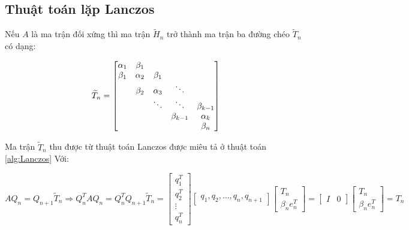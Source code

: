 \documentclass[14pt, a4paper]{article}
\numberwithin{equation}{section}
\numberwithin{algorithm}{section}
\numberwithin{figure}{section}
\numberwithin{dl}{section}
\numberwithin{md}{section}
\numberwithin{bd}{section}
\numberwithin{dn}{section}
\numberwithin{hq}{section}
\begin{document}
\subsection{Thuật toán lặp Lanczos} \label{Lanczos-Algorithm}


Nếu $A$ là ma trận đối xứng thì ma trận $\widetilde{H}_n$ trở thành ma trận ba đường chéo $\widetilde{T}_n$ có dạng:

\begin{equation} \label{eq:Trigonal_Matrix}
    \widetilde{T}_n = \begin{bmatrix}
        \alpha_1 & \beta_1 & \space & \space & \space \\
        \beta_1 & \alpha_2 & \beta_1 & \space & \space \\
        \space & \beta_2 & \alpha_3 & \ddots & \space \\
        \space & \space & \ddots & \ddots & \beta_{k-1} \\
        \space & \space & \space & \beta_{k-1} & \alpha_k \\
        \space & \space & \space & \space & \beta_{n}
    \end{bmatrix}
\end{equation}

Ma trận $\widetilde{T}_n$ thu được từ thuật toán Lanczos được miêu tả ở thuật toán \ref{alg:Lanczos}
Với:

\begin{equation} \label{eq:Three-term-recurrence}
    AQ_n = Q_{n+1}\widetilde{T}_n \Rightarrow Q_n^TAQ_n = Q_n^TQ_{n+1}\widetilde{T}_n=\begin{bmatrix}
        q_1^T \\ q_2^T \\ \vdots \\ q_n^T
    \end{bmatrix} \begin{bmatrix} q_1, q_2, \dots, q_n, q_{n+1} \end{bmatrix}\begin{bmatrix}
        T_n \\ \beta_n e_n^T
    \end{bmatrix}=\begin{bmatrix}
        I & 0
    \end{bmatrix} \begin{bmatrix}
        T_n \\ \beta_n e_n^T
    \end{bmatrix}=T_n
\end{equation}
\end{document}

